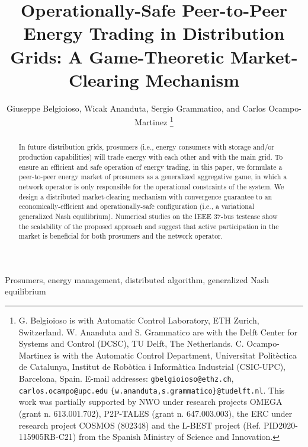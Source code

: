 \documentclass{IEEEtran}  %
\title{%
Operationally-Safe Peer-to-Peer Energy Trading in Distribution Grids: A Game-Theoretic Market-Clearing Mechanism
}
\author{Giuseppe Belgioioso, Wicak Ananduta, Sergio Grammatico, and Carlos Ocampo-Martinez
\thanks{
	G. Belgioioso is with Automatic Control Laboratory, ETH Zurich, Switzerland. W. Ananduta and S. Grammatico are with the Delft Center for Systems and Control (DCSC), TU Delft, The Netherlands. C. Ocampo-Martinez is with the Automatic Control Department, Universitat Polit\`{e}ctica de Catalunya, Institut de Rob\`otica i Inform\`atica Industrial (CSIC-UPC), Barcelona, Spain. 
	E-mail addresses: \texttt{gbelgioioso@ethz.ch}, \texttt{carlos.ocampo@upc.edu} \texttt{\{w.ananduta,s.grammatico\}@tudelft.nl}. This work was partially supported by NWO under research projects OMEGA (grant n. 613.001.702), P2P-TALES (grant n. 647.003.003), the ERC under research project COSMOS (802348) and the L-BEST project (Ref. PID2020-115905RB-C21) from the Spanish Ministry of Science and Innovation. 
}
}
\newcommand{\0}{\mathbf{0}}
\newcommand{\1}{\mathbf{1}}
\begin{document}
\maketitle

\begin{abstract}
In future distribution grids, prosumers (i.e., energy consumers with storage and/or production capabilities) will trade energy with each other and with the main grid.
%
To ensure an efficient and safe operation of energy trading, in this paper, we formulate a peer-to-peer energy market of prosumers as a generalized aggregative game, in which a network operator is only  responsible for the operational constraints of the system.
%
We design a distributed market-clearing mechanism with convergence guarantee to an economically-efficient and operationally-safe configuration (i.e., a variational generalized Nash equilibrium). 
%
Numerical studies on the IEEE 37-bus testcase show the scalability of the proposed approach and suggest that active participation in the market is beneficial for both prosumers and the network operator.  
\end{abstract}
\begin{IEEEkeywords}
	Prosumers, energy management, distributed algorithm, generalized Nash equilibrium
\end{IEEEkeywords}
\end{document}
